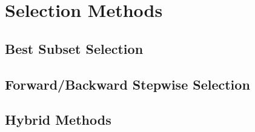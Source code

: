 \section{Selection Methods}

\subsection{Best Subset Selection}

\subsection{Forward/Backward Stepwise Selection}

\subsection{Hybrid Methods}
